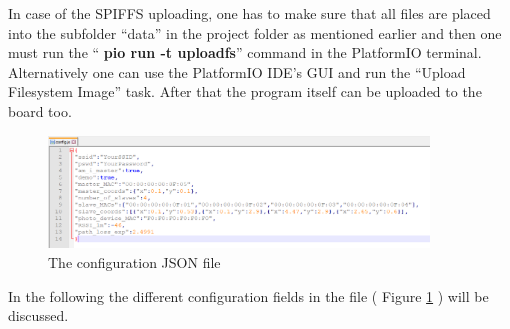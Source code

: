 \documentclass[11pt,a4paper]{article}
\numberwithin{equation}{section}   %
\numberwithin{figure}{section}     %
\numberwithin{table}{section}      %
\begin{document}
In case of the SPIFFS uploading, one has to make sure that all files are placed into the subfolder ``data'' in the project folder as mentioned earlier and then one must run the ``{\selectfont
\textbf{pio run -t uploadfs}}'' command in the PlatformIO terminal. Alternatively one can use the PlatformIO IDE's GUI and run the ``Upload Filesystem Image'' task. After that the program itself can be uploaded to the board too.

\begin{figure}[H]
    \centering
    \includegraphics[width = 0.9\textwidth]{figures/configFile.PNG}
    \caption{The configuration JSON file}
    \label{fig:config}
\end{figure}

In the following the different configuration fields in the file ( Figure \ref{fig:config} ) will be discussed.
\end{document}
